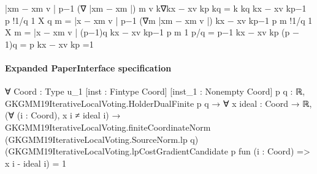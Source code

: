 \documentclass[10pt]{article}
\begin{document}
\begin{ReviewVerbatim}
                         |xm − xm
                                v |
                                   p−1 (∇ |xm − xm |)
                                         m       v
 k∇kx − xv kp kq = k                                                  kq
                                    kx − xv kp−1
                                             p
                                                                                             !1/q
                              1              X                                         q
                                                        m
                    =                              |x       − xm
                                                               v |
                                                                   p−1
                                                                       (∇m |xm − xm
                                                                                  v |)
                        kx − xv kp−1
                                 p            m
                                                                           !1/q
                              1              X
                                                        m
                    =                              |x       − xm
                                                               v |
                                                                  (p−1)q
                        kx − xv kp−1
                                 p            m
                             1                p/q
                    =            p−1 kx − xv kp                                                     (p − 1)q = p
                        kx − xv kp
                    =1
\end{ReviewVerbatim}



\paragraph{Expanded PaperInterface specification}
\begin{ReviewVerbatim}
∀ {Coord : Type u_1} [inst : Fintype Coord] [inst_1 : Nonempty Coord] {p q : ℝ},
  GKGMM19IterativeLocalVoting.HolderDualFinite p q →
    ∀ {x ideal : Coord → ℝ},
      (∀ (i : Coord), x i ≠ ideal i) →
        GKGMM19IterativeLocalVoting.finiteCoordinateNorm (GKGMM19IterativeLocalVoting.SourceNorm.lp q)
            (GKGMM19IterativeLocalVoting.lpCostGradientCandidate p fun (i : Coord) => x i - ideal i) =
          1
\end{ReviewVerbatim}
\end{document}
